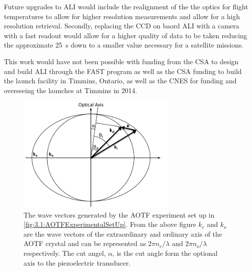 \documentclass[12pt]{article}
\begin{document}
Future upgrades to ALI would include the realignment of the the optics for flight temperatures to allow for higher resolution measurements and allow for a high resolution retrieval. Secondly, replacing the CCD on baord ALI with a camera with a fast readout would allow for a higher quality of data to be taken reducing the approximate 25~s down to a smaller value necessary for a satellite missions.

This work would have not been possible with funding from the CSA to design and build ALI through the FAST program as well as the CSA funding to build the launch facility in Timmins, Ontario, as well as the CNES for funding and overseeing the launches at Timmins in 2014.


\newpage



\newpage

\begin{figure}[h!]
    \begin{center}
    \includegraphics[width=0.7\textwidth]{./Images/3-1-AOTFWavevectorWithRefraction.pdf}
    \caption[Wave Vectors Generated by an AOTF]{The wave vectors generated by the AOTF experiment set up in \autoref{fig:3.1:AOTFExperimentalSetUp}. From the above figure $k_{e}$ and $k_{o}$ are the wave vectors of the extraordinary and ordinary axis of the AOTF crystal and can be represented as $2\pi n_{e}/\lambda$ and $2\pi n_{o}/\lambda$ respectively. The cut angel, $\alpha$, is the cut angle form the optional axis to the piezoelectric transducer.}
    \label{fig:3.1:ATOFWavevectors}
    \end{center}
\end{figure}
\end{document}
